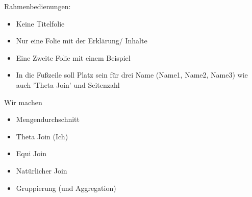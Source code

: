\documentclass[a4paper]{article}
\begin{document}
Rahmenbedienungen:

\begin{itemize}
    \item Keine Titelfolie
    \item Nur eine Folie mit der Erklärung/ Inhalte
    \item Eine Zweite Folie mit einem Beispiel
    \item In die Fußzeile soll Platz sein für drei Name (Name1, Name2, Name3) wie auch 'Theta Join' und Seitenzahl
\end{itemize}

Wir machen 

\begin{itemize}
    \item Mengendurchschnitt
    \item Theta Join (Ich)
    \item Equi Join
    \item Natürlicher Join
    \item Gruppierung (und Aggregation)
\end{itemize}
\end{document}
